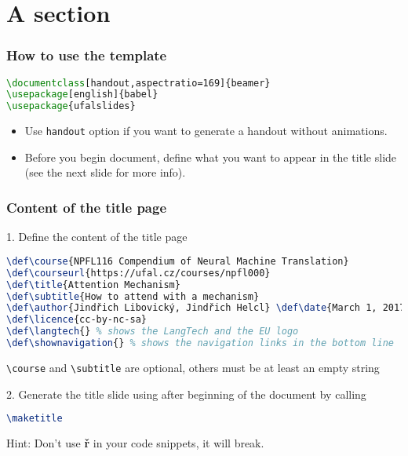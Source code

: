 \documentclass[handout,aspectratio=169]{beamer}
\def\course{NPFL000 Name of the course}
\def\courseurl{https://ufal.cz/courses/npfl000}
\def\title{\LaTeX~template for LangTech courses taught at ÚFAL}
\def\author{Jindřich Libovický}
\def\date{September 7, 2018}
\def\licence{cc-by-nc-sa}
\def\langtech{}
\def\shownavigation{}
\begin{document}
\maketitle


\section{A section}

\begin{frame}[fragile]
    \frametitle{How to use the template}

    \begin{lstlisting}[language=TeX]
\documentclass[handout,aspectratio=169]{beamer}
\usepackage[english]{babel}
\usepackage{ufalslides}
\end{lstlisting}

    \begin{itemize}
        \item Use \lstinline{handout} option if you want to generate a handout without
    animations.

        \item Before you begin document, define what you want to
            appear in the title slide (see the next slide for more info).
    \end{itemize}

\end{frame}


\begin{frame}[fragile]
    \frametitle{Content of the title page}

1. Define the content of the title page
    \begin{lstlisting}[language=TeX]
\def\course{NPFL116 Compendium of Neural Machine Translation}
\def\courseurl{https://ufal.cz/courses/npfl000}
\def\title{Attention Mechanism}
\def\subtitle{How to attend with a mechanism}
\def\author{Jindřich Libovický, Jindřich Helcl} \def\date{March 1, 2017}
\def\licence{cc-by-nc-sa}
\def\langtech{} % shows the LangTech and the EU logo
\def\shownavigation{} % shows the navigation links in the bottom line
\end{lstlisting}

    {\tt  \textbackslash course} and {\tt  \textbackslash subtitle} are optional, others must be at least
    an empty string

2. Generate the title slide using after beginning of the document by calling
\begin{lstlisting}[language=TeX]
\maketitle
\end{lstlisting}

    \vspace{5pt}

    Hint: Don't use \textbf{ř} in your code snippets, it will break.

\end{frame}
\end{document}
